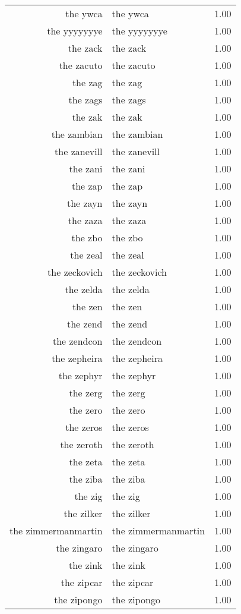 \begin{table}[ht]
\begin{tabular}{rlr}
  the ywca & the ywca & 1.00 \\ 
  the yyyyyyye & the yyyyyyye & 1.00 \\ 
  the zack & the zack & 1.00 \\ 
  the zacuto & the zacuto & 1.00 \\ 
  the zag & the zag & 1.00 \\ 
  the zags & the zags & 1.00 \\ 
  the zak & the zak & 1.00 \\ 
  the zambian & the zambian & 1.00 \\ 
  the zanevill & the zanevill & 1.00 \\ 
  the zani & the zani & 1.00 \\ 
  the zap & the zap & 1.00 \\ 
  the zayn & the zayn & 1.00 \\ 
  the zaza & the zaza & 1.00 \\ 
  the zbo & the zbo & 1.00 \\ 
  the zeal & the zeal & 1.00 \\ 
  the zeckovich & the zeckovich & 1.00 \\ 
  the zelda & the zelda & 1.00 \\ 
  the zen & the zen & 1.00 \\ 
  the zend & the zend & 1.00 \\ 
  the zendcon & the zendcon & 1.00 \\ 
  the zepheira & the zepheira & 1.00 \\ 
  the zephyr & the zephyr & 1.00 \\ 
  the zerg & the zerg & 1.00 \\ 
  the zero & the zero & 1.00 \\ 
  the zeros & the zeros & 1.00 \\ 
  the zeroth & the zeroth & 1.00 \\ 
  the zeta & the zeta & 1.00 \\ 
  the ziba & the ziba & 1.00 \\ 
  the zig & the zig & 1.00 \\ 
  the zilker & the zilker & 1.00 \\ 
  the zimmermanmartin & the zimmermanmartin & 1.00 \\ 
  the zingaro & the zingaro & 1.00 \\ 
  the zink & the zink & 1.00 \\ 
  the zipcar & the zipcar & 1.00 \\ 
  the zipongo & the zipongo & 1.00 \\ 

\end{tabular}
\end{table}
